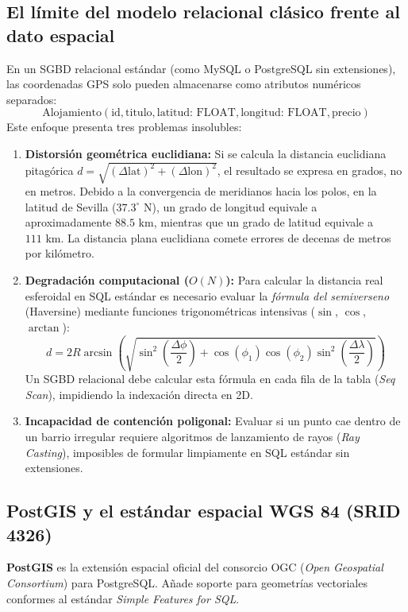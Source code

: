 \documentclass[a4paper,12pt]{article}
\begin{document}
\subsection{El límite del modelo relacional clásico frente al dato espacial}
En un SGBD relacional estándar (como MySQL o PostgreSQL sin extensiones), las coordenadas GPS solo pueden almacenarse como atributos numéricos separados:
\begin{equation}
  \text{Alojamiento}(\text{id}, \text{titulo}, \text{latitud: FLOAT}, \text{longitud: FLOAT}, \text{precio})
\end{equation}
Este enfoque presenta tres problemas insolubles:
\begin{enumerate}[leftmargin=1.0cm]
  \item \textbf{Distorsión geométrica euclidiana:} Si se calcula la distancia euclidiana pitagórica $d = \sqrt{(\Delta \text{lat})^2 + (\Delta \text{lon})^2}$, el resultado se expresa en grados, no en metros. Debido a la convergencia de meridianos hacia los polos, en la latitud de Sevilla ($37.3^\circ$ N), un grado de longitud equivale a aproximadamente $88.5\text{ km}$, mientras que un grado de latitud equivale a $111\text{ km}$. La distancia plana euclidiana comete errores de decenas de metros por kilómetro.
  \item \textbf{Degradación computacional ($O(N)$):} Para calcular la distancia real esferoidal en SQL estándar es necesario evaluar la \textit{fórmula del semiverseno} (Haversine) mediante funciones trigonométricas intensivas ($\sin$, $\cos$, $\arctan$):
  \begin{equation}
    d = 2R \arcsin \left( \sqrt{\sin^2\left(\frac{\Delta \phi}{2}\right) + \cos(\phi_1)\cos(\phi_2)\sin^2\left(\frac{\Delta \lambda}{2}\right)} \right)
  \end{equation}
  Un SGBD relacional debe calcular esta fórmula en cada fila de la tabla (\textit{Seq Scan}), impidiendo la indexación directa en 2D.
  \item \textbf{Incapacidad de contención poligonal:} Evaluar si un punto cae dentro de un barrio irregular requiere algoritmos de lanzamiento de rayos (\textit{Ray Casting}), imposibles de formular limpiamente en SQL estándar sin extensiones.
\end{enumerate}

\subsection{PostGIS y el estándar espacial WGS 84 (SRID 4326)}
\textbf{PostGIS} es la extensión espacial oficial del consorcio OGC (\textit{Open Geospatial Consortium}) para PostgreSQL. Añade soporte para geometrías vectoriales conformes al estándar \textit{Simple Features for SQL}.
\end{document}
